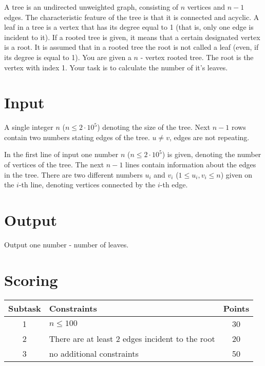 \documentclass{spiral}
\begin{document}
    \makeheader

    A tree is an undirected unweighted graph,
    consisting of $n$ vertices and $n-1$ edges.
    The characteristic feature of the tree is that it is connected and acyclic.
    A leaf in a tree is a vertex that has its degree equal to 1
    (that is, only one edge is incident to it).
    If a rooted tree is given, it means that a certain designated vertex is a root.
    It is assumed that in a rooted tree the root is not called a leaf
    (even, if its degree is equal to 1).
    You are given a $n$ - vertex rooted tree.
    The root is the vertex with index 1.
    Your task is to calculate the number of it's leaves.

\section{Input}

    A single integer $n$ ($n \leq 2 \cdot 10^5$) denoting the size of the tree.
    Next $n-1$ rows contain two numbers stating edges of the tree.
    $u \neq v$, edges are not repeating.

    In the first line of input one number $n$ ($n \leq 2 \cdot 10^5$) is given,
    denoting the number of vertices of the tree.
    The next $n-1$ lines contain information about the edges in the tree.
    There are two different numbers $u_i$ and $v_i$ ($1 \leq u_i, v_i \leq n$)
    given on the $i$-th line, denoting vertices connected by the $i$-th edge.

\section{Output}

    Output one number - number of leaves.


\section{Scoring}

    \begin{center}
        \begin{tabular}{|c|p{5cm}|c|}
            \hline
            \textbf{Subtask} & \textbf{Constraints} & \textbf{Points} \\
            \hline
            1 & $n \leq 100$ & 30 \\
            \hline
            2 & There are at least 2 edges incident to the root & 20 \\
            \hline
            3 & no additional constraints & 50 \\
            \hline
        \end{tabular}
    \end{center}
\end{document}
